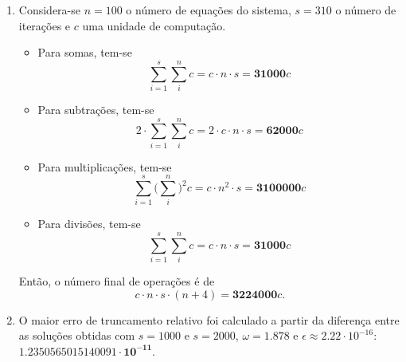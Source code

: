 \documentclass{article}
\newenvironment{arabenum}{
    \begin{enumerate}[label=\textbf{\arabic*})]
}{
    \end{enumerate}
}
\newenvironment{alphenum}{
    \begin{enumerate}[label=(\alph*)]
}{
    \end{enumerate}
}
\begin{document}
\begin{arabenum}
\begin{alphenum}
\item Considera-se $n = 100$ o número de equações do sistema, $s = 310$ o
número de iterações e $c$ uma unidade de computação.

\begin{itemize}

\item Para somas, tem-se
\begin{equation*}
\sum_{i=1}^s \sum_{i}^n c = c \cdot n \cdot s = \boldsymbol{31000}c
\end{equation*}

\item Para subtrações, tem-se
\begin{equation*}
2 \cdot \sum_{i=1}^s \sum_{i}^n c = 2 \cdot c \cdot n \cdot s
= \boldsymbol{62000}c
\end{equation*}

\item Para multiplicações, tem-se
\begin{equation*}
\sum_{i=1}^s \Big(\sum_{i}^n\Big)^2 c = c \cdot n^2 \cdot s
= \boldsymbol{3100000}c
\end{equation*}

\item Para divisões, tem-se
\begin{equation*}
\sum_{i=1}^s \sum_{i}^n c = c \cdot n \cdot s = \boldsymbol{31000}c
\end{equation*}

\end{itemize}

Então, o número final de operações é de
\begin{equation*}
c \cdot n \cdot s \cdot (n + 4) = \boldsymbol{3224000}c.
\end{equation*}

\item O maior erro de truncamento relativo foi calculado a partir da diferença
entre as soluções obtidas com $s = 1000$ e $s = 2000$, $\omega = 1.878$
e $\epsilon \approx 2.22 \cdot 10^{-16}$:
$\boldsymbol{1.2350565015140091 \cdot 10^{-11}}$.

\end{alphenum}

\end{arabenum}
\end{document}
